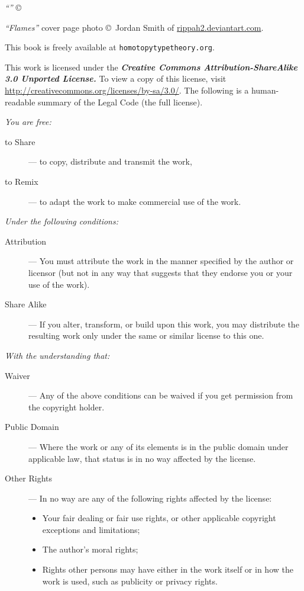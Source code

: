 {\footnotesize
\noindent
\emph{``\ourtitle''}
\copyright\firstpublicationyear~\ourauthor

\bigskip\bigskip

\noindent
\emph{``Flames''} cover page photo
\copyright\ Jordan Smith of \href{http://rippah2.deviantart.com/}{rippah2.deviantart.com}.

\bigskip

\noindent
This book is freely available at
{\tt homotopytypetheory.org}.
%

\bigskip

\noindent
This work is licensed under the
\textbf{\emph{Creative Commons Attribution-ShareAlike 3.0 Unported License.}}
%
To view a copy of this license, visit
\href{http://creativecommons.org/licenses/by-sa/3.0/}{http://creativecommons.org/licenses/by-sa/3.0/}.
The following is a human-readable summary of the Legal Code (the full license).

\bigskip

\noindent
\emph{You are free:}
%
\begin{description}
\item[to Share] --- to copy, distribute and transmit the work,
\item[to Remix] --- to adapt the work to make commercial use of the work.
\end{description}
%
\emph{Under the following conditions:}
%
\begin{description}

\item[Attribution] --- You must attribute the work in the manner specified by the author
  or licensor (but not in any way that suggests that they endorse you or your use of the
  work).

\item[Share Alike] --- If you alter, transform, or build upon this work, you may
  distribute the resulting work only under the same or similar license to this one.
\end{description}
%
\emph{With the understanding that:}
\begin{description}

\item[Waiver] --- Any of the above conditions can be waived if you get permission from the
  copyright holder.

\item[Public Domain] --- Where the work or any of its elements is in the public domain
  under applicable law, that status is in no way affected by the license.

\item[Other Rights] --- In no way are any of the following rights affected by the license:
  \begin{itemize}
  \item Your fair dealing or fair use rights, or other applicable copyright exceptions and
    limitations;
  \item The author's moral rights;
  \item Rights other persons may have either in the work itself or in how the work is
    used, such as publicity or privacy rights.
  \end{itemize}
\end{description}
}
\cleardoublepage

\restoregeometry

\pagestyle{fancyplain}

